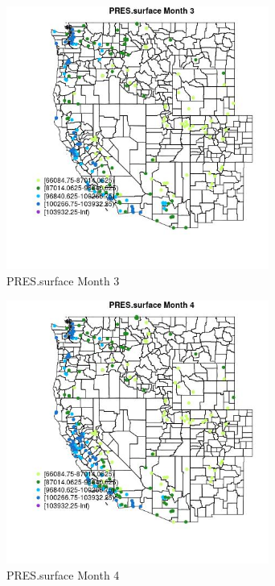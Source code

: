 \begin{figure} 
\centering  
\includegraphics[width=0.77\textwidth]{Code_Outputs/Report_ML_input_PM25_Step4_part_e_de_duplicated_aveswNAs_MapObsMo3PRESsurface.jpg} 
\caption{\label{fig:Report_ML_input_PM25_Step4_part_e_de_duplicated_aveswNAsMapObsMo3PRESsurface}PRES.surface Month 3} 
\end{figure} 
 

\clearpage 

\begin{figure} 
\centering  
\includegraphics[width=0.77\textwidth]{Code_Outputs/Report_ML_input_PM25_Step4_part_e_de_duplicated_aveswNAs_MapObsMo4PRESsurface.jpg} 
\caption{\label{fig:Report_ML_input_PM25_Step4_part_e_de_duplicated_aveswNAsMapObsMo4PRESsurface}PRES.surface Month 4} 
\end{figure} 
 

